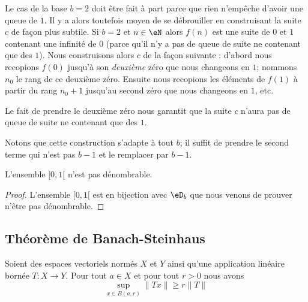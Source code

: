 \begin{remark}
    Le cas de la base \( b=2\) doit être fait à part parce que rien n'empêche d'avoir une queue de \( 1\). Il y a alors toutefois moyen de se débrouiller en construisant la suite \( c\) de façon plus subtile. Si \( b=2\) et \( n\in \eN\) alors \( f(n)\) est une suite de \( 0\) et \( 1\) contenant une infinité de \( 0\) (parce qu'il n'y a pas de queue de suite ne contenant que des \( 1\)). Nous construisons alors \( c\) de la façon suivante : d'abord nous recopions \( f(0)\) jusqu'à son \emph{deuxième} zéro que nous changeons en \( 1\); nommons \( n_0\) le rang de ce deuxième zéro. Ensuite nous recopions les éléments de \( f(1) \) à partir du rang \( n_0+1\) jusqu'au second zéro que nous changeons en \( 1\), etc.

    Le fait de prendre le deuxième zéro nous garantit que la suite \( c\) n'aura pas de queue de suite ne contenant que des \( 1\).

    Notons que cette construction s'adapte à tout \( b\); il suffit de prendre le second terme qui n'est pas \( b-1\) et le remplacer par \( b-1\).
\end{remark}

\begin{corollary}
    L'ensemble \( \mathopen[ 0 , 1 [\) n'est pas dénombrable.
\end{corollary}

\begin{proof}
    L'ensemble \( \mathopen[ 0 , 1 [\) est en bijection avec \( \eD_b\) que nous venons de prouver n'être pas dénombrable.
\end{proof}

\subsection{Théorème de Banach-Steinhaus}

\begin{lemma}     \label{LEMooPIPLooMppGSO}
    Soient des espaces vectoriels normés \( X\) et \( Y\) ainsi qu'une application linéaire bornée \( T\colon X\to Y\). Pour tout \( a\in X\) et pour tout \( r>0\) nous avons
    \begin{equation}
        \sup_{x\in B(a,r)}\| Tx \|\geq r\| T \|
    \end{equation}
\end{lemma}

